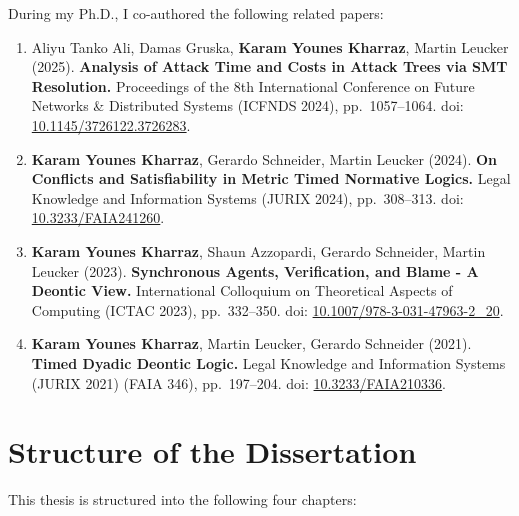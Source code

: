  

 During my Ph.D., I co-authored the following related papers:%
 \begin{enumerate}
 
   \item
   Aliyu Tanko Ali, Damas Gruska, \textbf{Karam Younes Kharraz}, Martin Leucker (2025).
   \textbf{Analysis of Attack Time and Costs in Attack Trees via SMT Resolution.}
   Proceedings of the 8th International Conference on Future Networks \& Distributed Systems (ICFNDS 2024), pp.\ 1057--1064.
   doi: \href{https://doi.org/10.1145/3726122.3726283}{10.1145/3726122.3726283}.
 
   \item
   \textbf{Karam Younes Kharraz}, Gerardo Schneider, Martin Leucker (2024).
   \textbf{On Conflicts and Satisfiability in Metric Timed Normative Logics.}
   Legal Knowledge and Information Systems (JURIX 2024), pp.\ 308--313.
   doi: \href{https://doi.org/10.3233/FAIA241260}{10.3233/FAIA241260}.
 
   \item
   \textbf{Karam Younes Kharraz}, Shaun Azzopardi, Gerardo Schneider, Martin Leucker (2023).
   \textbf{Synchronous Agents, Verification, and Blame - A Deontic View.}
   International Colloquium on Theoretical Aspects of Computing (ICTAC 2023), pp.\ 332--350.
   doi: \href{https://doi.org/10.1007/978-3-031-47963-2_20}{10.1007/978-3-031-47963-2\_20}.
 
   \item
   \textbf{Karam Younes Kharraz}, Martin Leucker, Gerardo Schneider (2021).
   \textbf{Timed Dyadic Deontic Logic.}
   Legal Knowledge and Information Systems (JURIX 2021) (FAIA 346), pp.\ 197--204.
   doi: \href{https://doi.org/10.3233/FAIA210336}{10.3233/FAIA210336}.
 \end{enumerate}

\section{Structure of the Dissertation}

This thesis is structured into the following four chapters:

